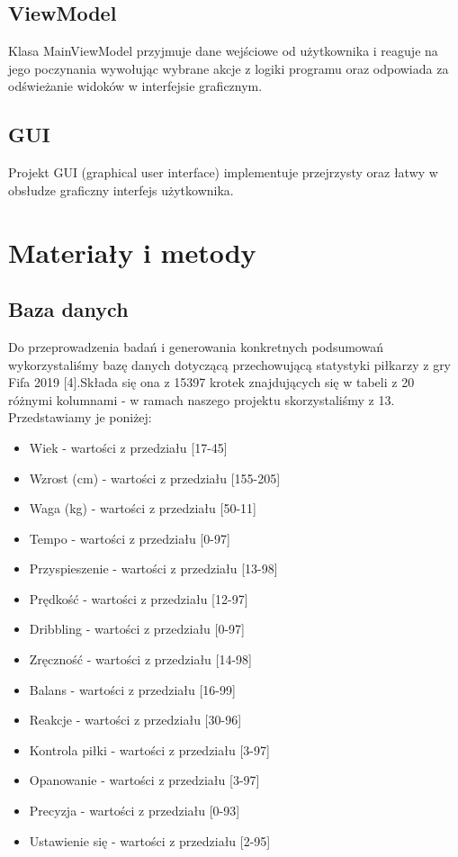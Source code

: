 \documentclass{classrep}
\begin{document}
\subsection{ViewModel}

Klasa MainViewModel przyjmuje dane wejściowe od użytkownika i reaguje na jego poczynania wywołując wybrane akcje z logiki programu oraz odpowiada za odświeżanie widoków w interfejsie graficznym.

\subsection{GUI}

Projekt GUI (graphical user interface) implementuje przejrzysty oraz łatwy w obsłudze graficzny interfejs użytkownika.

\section{Materiały i metody}

\subsection{Baza danych}
Do przeprowadzenia badań i generowania konkretnych podsumowań wykorzystaliśmy bazę danych dotyczącą przechowującą statystyki piłkarzy z gry Fifa 2019 [4].Składa się ona z 15397 krotek znajdujących się w tabeli z 20 różnymi kolumnami - w ramach naszego projektu skorzystaliśmy z 13. Przedstawiamy je poniżej:

\begin{itemize}
	\item Wiek - wartości z przedziału [17-45]
	\item Wzrost (cm) - wartości z przedziału [155-205]
	\item Waga (kg) - wartości z przedziału [50-11] 
	\item Tempo - wartości z przedziału [0-97]
	\item Przyspieszenie - wartości z przedziału [13-98]
	\item Prędkość - wartości z przedziału [12-97]
	\item Dribbling - wartości z przedziału [0-97]
	\item Zręczność - wartości z przedziału [14-98]
	\item Balans - wartości z przedziału [16-99]
	\item Reakcje - wartości z przedziału [30-96]
	\item Kontrola piłki - wartości z przedziału [3-97]
	\item Opanowanie - wartości z przedziału [3-97]
	\item Precyzja - wartości z przedziału [0-93]
	\item Ustawienie się - wartości z przedziału [2-95]
\end{itemize}
\end{document}
